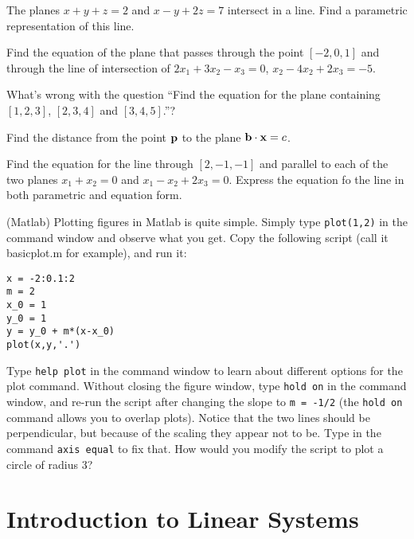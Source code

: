 \begin{problem}
\label{2009_a2_5}
The planes $x+y+z = 2$ and $x-y+2z=7$ intersect in a line. Find
a parametric representation of this line. 
\end{problem}

\begin{problem}
\label{op1_29}
Find the equation of the plane that passes through the point $[-2,0,1]$ and
through the line of intersection of $2x_1+3x_2-x_3=0$, $x_2-4x_2+2x_3=-5$.
\end{problem}

\begin{problem}
\label{op1_30}
What's wrong with the question ``Find the equation for the plane containing 
$[1,2,3]$, $[2,3,4]$ and $[3,4,5]$.''?
\end{problem}

\begin{problem}
\label{op1_31}
Find the distance from the point ${\bf p}$ to the plane ${\bf b}\cdot{\bf x}=c$.
\end{problem}

\begin{problem}
\label{op1_32}
Find the equation for the line through $[2,-1,-1]$ and parallel to each of the
two planes $x_1+x_2=0$ and $x_1-x_2+2x_3=0$. Express the equation fo the line
in both parametric and equation form.
\end{problem}

\begin{problem}
\label{matlab_op1_36}
(Matlab) Plotting figures in Matlab is quite simple. Simply type {\tt plot(1,2)} in the command window and observe what you get. Copy the following script (call it basicplot.m for example), and run it:
\begin{verbatim}
x = -2:0.1:2
m = 2
x_0 = 1
y_0 = 1
y = y_0 + m*(x-x_0)
plot(x,y,'.')
\end{verbatim}
Type {\tt help plot} in the command window to learn about different options for the plot command. Without closing the figure window, type {\tt hold on} in the command window, and re-run the script after changing the slope to {\tt m = -1/2} (the {\tt hold on} command allows you to overlap plots). Notice that the two lines should be perpendicular, but because of the scaling they appear not to be. Type in the command {\tt axis equal} to fix that. How would you modify the script to plot a circle of radius 3?

\end{problem}

\section{Introduction to Linear Systems}

